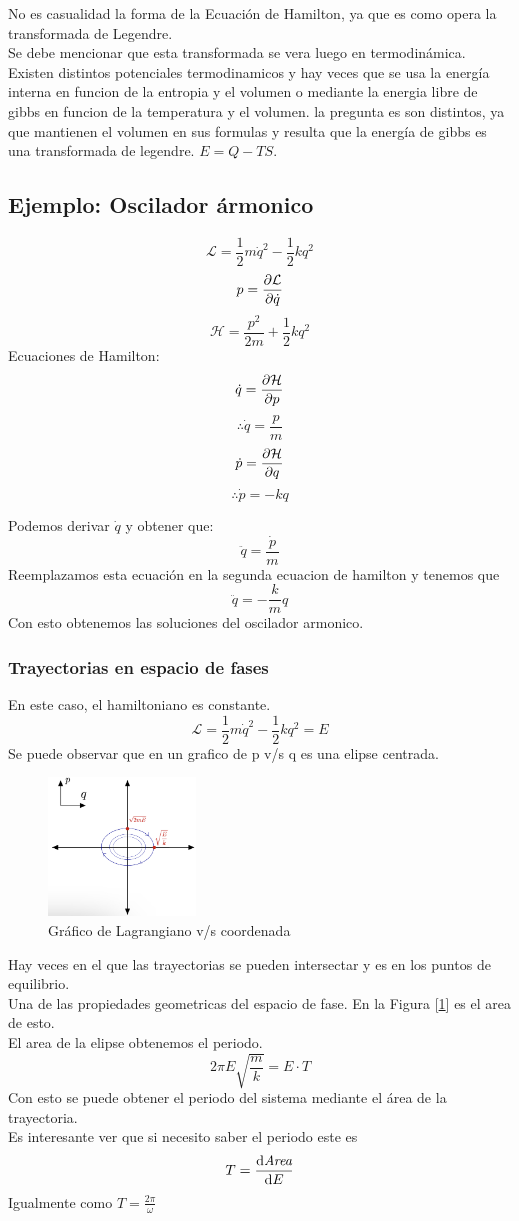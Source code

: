 \documentclass[12pt]{article}
\newcommand{\eq}[1]{\[#1\]}
\newcommand{\en}[1]{\[\boxed{#1}\]}
\renewcommand{\ss}[1]{\subsection{#1}}
\newcommand{\sss}[1]{\subsubsection{#1}}
\newcommand{\fgref}[1]{Figura [\ref{#1}]}
\begin{document}
No es casualidad la forma de la Ecuación de Hamilton, ya que es como opera la transformada de Legendre.\\
Se debe mencionar que esta transformada se vera luego en termodinámica. Existen distintos potenciales termodinamicos y hay veces que se usa la energía interna en funcion de la entropia y el volumen o mediante la energia libre de gibbs en funcion de la temperatura y el volumen. la pregunta es son distintos, ya que mantienen el volumen en sus formulas y resulta que la energía de gibbs es una transformada de legendre.  $E= Q - TS$.
 \newpage
 
 \ss{Ejemplo: Oscilador ármonico}
 $$\mathcal{L} = \frac{1}{2}m \dot{q}^2 - \frac{1}{2}k q^2$$
 $$p = \pdv{\mathcal{L}}{\dot{q}}$$
 \en{\mathcal{H}= \frac{p^2}{2m} + \frac{1}{2} k q^2}
 Ecuaciones de Hamilton:\\
 $$\dot{q} = \pdv{\mathcal{H}}{p}$$
 $$\therefore \dot{q}= \frac{p}{m}$$
 $$\dot{p}= \pdv{\mathcal{H}}{q} $$
 $$\therefore \dot{p}=-kq$$
 
 
 Podemos derivar $\dot{q}$ y obtener que:
 \eq{\ddot{q}= \frac{\dot{p}}{m}}
Reemplazamos esta ecuación en la segunda ecuacion de hamilton y tenemos que 
\eq{\ddot{q}=-\frac{k}{m}q}
Con esto obtenemos las soluciones del oscilador armonico.\\
\sss{Trayectorias en espacio de fases}
En este caso, el hamiltoniano es constante.
 $$\mathcal{L} = \frac{1}{2}m \dot{q}^2 - \frac{1}{2}k q^2 =E$$
Se puede observar que en un grafico de p v/s q es una elipse centrada.
\begin{figure}[h!]
    \centering
    \includegraphics[width=0.35\textwidth]{grafico_pq.png}
    \caption{Gráfico de Lagrangiano v/s coordenada}
    \label{grafico_pq}
\end{figure}
Hay veces en el que las trayectorias se pueden intersectar y es en los puntos de equilibrio.\\
Una de las propiedades geometricas del espacio de fase. En la \fgref{grafico_pq} es el area de esto.\\
El area de la elipse obtenemos el periodo.
$$2\pi E \sqrt{\frac{m}{k}}= E \cdot T$$
Con esto se puede obtener el periodo del sistema mediante el área de la trayectoria.\\
Es interesante ver que si necesito saber el periodo este es \\
\eq{T= \dv{\textit{Area}}{E}}
Igualmente como $T=\frac{2 \pi}{\omega}$\\
\end{document}
